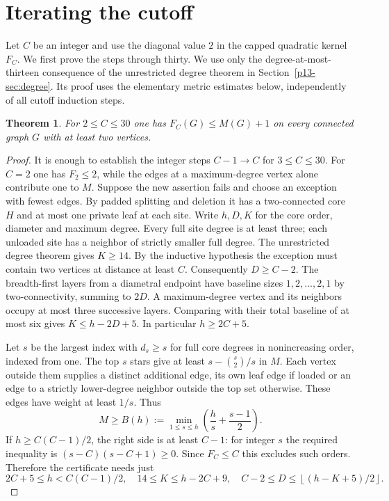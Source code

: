 \documentclass[11pt,a4paper]{article}
\newtheorem{theorem}{Theorem}[section]
\begin{document}
\section{Iterating the cutoff}
Let $C$ be an integer and use the diagonal value $2$ in the capped quadratic kernel $F_C$.
We first prove the steps through thirty. We use only the degree-at-most-thirteen consequence of the unrestricted degree theorem in Section~\ref{p13-sec:degree}. Its proof uses the elementary metric estimates below, independently of all cutoff induction steps.
\begin{theorem}
For $2\le C\le30$ one has $F_C(G)\le M(G)+1$ on every
connected graph $G$ with at least two vertices.
\end{theorem}
\begin{proof}
It is enough to establish the integer steps $C-1\longrightarrow C$ for
$3\le C\le30$. For $C=2$ one has $F_2\le2$, while the edges at a maximum-degree vertex alone contribute one to $M$.
Suppose the new assertion fails and choose an exception with fewest edges.
By padded splitting and deletion it has a two-connected core $H$ and at
most one private leaf at each site. Write $h,D,K$ for the core order,
diameter and maximum degree. Every full site degree is at least three;
each unloaded site has a neighbor of strictly smaller full degree. The
unrestricted degree theorem gives $K\ge14$. By the inductive hypothesis
the exception must contain two vertices at distance at least $C$.
Consequently $D\ge C-2$. The breadth-first layers from a diametral endpoint
have baseline sizes $1,2,\ldots,2,1$ by two-connectivity, summing to
$2D$. A maximum-degree vertex and its neighbors occupy at most three
successive layers. Comparing with their total baseline of at most six
gives $K\le h-2D+5$. In particular $h\ge2C+5$.

Let $s$ be the largest index with $d_s\ge s$ for full core degrees in
nonincreasing order, indexed from one. The top $s$ stars give at least
$s-\binom s2/s$ in $M$. Each vertex outside them supplies a distinct
additional edge, its own leaf edge if loaded or an edge to a strictly
lower-degree neighbor outside the top set otherwise. These edges have
weight at least $1/s$. Thus
\[
 M\ge B(h):=\min_{1\le s\le h}\left(\frac hs+\frac{s-1}{2}\right).
\]
If $h\ge C(C-1)/2$, the right side is at least $C-1$: for integer $s$
the required inequality is $(s-C)(s-C+1)\ge0$. Since $F_C\le C$ this
excludes such orders. Therefore the certificate needs just
\[
 2C+5\le h<C(C-1)/2,\quad
 14\le K\le h-2C+9,\quad C-2\le D\le\left\lfloor (h-K+5)/2\right\rfloor .
\]


\end{proof}
\end{document}
